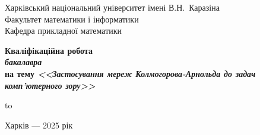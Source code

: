 \begin{titlepage}
	\begin{center}
		\Large Харківський національний університет імені В.Н.~Каразіна\\
		Факультет математики і інформатики\\
		Кафедра прикладної математики
	\end{center}

	\vfill
		
	\begin{center}	
		\LARGE \bfseries Кваліфікаційна робота
		\\
			{\normalsize \bfseries \slshape бакалавра}
		\\[0.5\baselineskip]
		{\mdseries на тему} \bfseries\slshape <<Застосування мереж Колмогорова-Арнольда до задач комп'ютерного зору>> \\[0.5\baselineskip]
	\end{center}
	
	\vfill
	

	\setlength{\tabcolsep}{3pt}
	\hbox to 
	
\vspace{\baselineskip}
	
	\begin{center}
		Харків --- 2025 рік
	\end{center}
	
\end{titlepage}